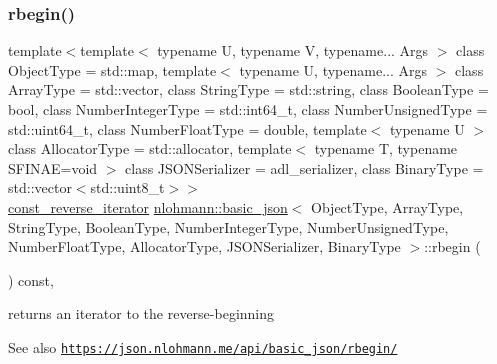 \subsubsection{\texorpdfstring{rbegin()}{rbegin()}\hspace{0.1cm}{\footnotesize\ttfamily [2/2]}}
{\footnotesize\ttfamily template$<$template$<$ typename U, typename V, typename... Args $>$ class Object\+Type = std\+::map, template$<$ typename U, typename... Args $>$ class Array\+Type = std\+::vector, class String\+Type  = std\+::string, class Boolean\+Type  = bool, class Number\+Integer\+Type  = std\+::int64\+\_\+t, class Number\+Unsigned\+Type  = std\+::uint64\+\_\+t, class Number\+Float\+Type  = double, template$<$ typename U $>$ class Allocator\+Type = std\+::allocator, template$<$ typename T, typename S\+F\+I\+N\+A\+E=void $>$ class J\+S\+O\+N\+Serializer = adl\+\_\+serializer, class Binary\+Type  = std\+::vector$<$std\+::uint8\+\_\+t$>$$>$ \\
\hyperlink{classnlohmann_1_1basic__json_aa7dba16ed9ee97380aeb17a207dd919a}{const\+\_\+reverse\+\_\+iterator} \hyperlink{classnlohmann_1_1basic__json}{nlohmann\+::basic\+\_\+json}$<$ Object\+Type, Array\+Type, String\+Type, Boolean\+Type, Number\+Integer\+Type, Number\+Unsigned\+Type, Number\+Float\+Type, Allocator\+Type, J\+S\+O\+N\+Serializer, Binary\+Type $>$\+::rbegin (\begin{DoxyParamCaption}{ }\end{DoxyParamCaption}) const\hspace{0.3cm}{\ttfamily [inline]}, {\ttfamily [noexcept]}}



returns an iterator to the reverse-\/beginning 

\begin{DoxySeeAlso}{See also}
\href{https://json.nlohmann.me/api/basic_json/rbegin/}{\tt https\+://json.\+nlohmann.\+me/api/basic\+\_\+json/rbegin/} 
\end{DoxySeeAlso}
\mbox{\label{classnlohmann_1_1basic__json_a7a328b29b290cc300345376c54f618cb}} 
